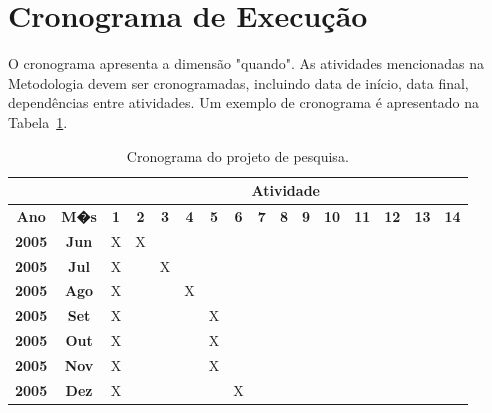 \documentclass[a4paper,titlepage,12pt]{article}
\begin{document}
\section{Cronograma de Execução}
\label{sec:cronograma}

O cronograma apresenta a dimensão "quando". As atividades mencionadas na Metodologia devem ser cronogramadas, incluindo data de início, data final, dependências entre atividades.
Um exemplo de cronograma é apresentado na Tabela~\ref{tab:cronograma}.

\begin{table}[ht]
\caption{Cronograma do projeto de pesquisa.} \label{tab:cronograma}
  \begin{center}
    \begin{tabular}{|c|c||c|c|c|c|c|c|c|c|c|c|c|c|c|c|} \hline
                       & & \multicolumn{14}{c|}{ {\bf Atividade } } \\\hline \hline
      {\bf Ano}  &{\bf M�s}  &{\bf 1}  &{\bf 2}  &{\bf 3} &{\bf 4}  &{\bf 5}  &{\bf 6}  &{\bf 7} &{\bf 8}  &{\bf 9}  &{\bf 10} &{\bf 11}  &{\bf 12}  &{\bf 13}  &{\bf 14}\\\hline
      {\bf 2005} &{\bf Jun}  & X       & X       &        &         &         &         &        &         &         &         &          &          &          &        \\\hline
      {\bf 2005} &{\bf Jul}  & X       &         & X      &         &         &         &        &         &         &         &          &          &          &        \\\hline
      {\bf 2005} &{\bf Ago}  & X       &         &        & X       &         &         &        &         &         &         &          &          &          &        \\\hline
      {\bf 2005} &{\bf Set}  & X       &         &        &         & X       &         &        &         &         &         &          &          &          &        \\\hline
      {\bf 2005} &{\bf Out}  & X       &         &        &         & X       &         &        &         &         &         &          &          &          &        \\\hline
      {\bf 2005} &{\bf Nov}  & X       &         &        &         & X       &         &        &         &         &         &          &          &          &        \\\hline
      {\bf 2005} &{\bf Dez}  & X       &         &        &         &         & X       &        &         &         &         &          &          &          &        \\\hline

\end{tabular}
\end{center}
\end{table}
\end{document}
